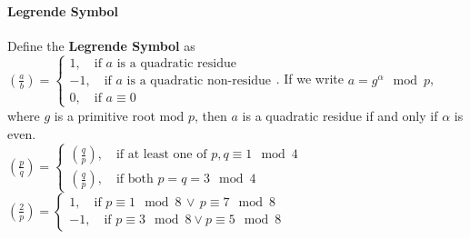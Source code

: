 \documentclass[10pt,letter]{article}
\theoremstyle{plain}
\theoremstyle{definition}
\begin{document}
\paragraph{Legrende Symbol}
Define the \textbf{Legrende Symbol} as $\left(\frac{a}{b}\right)=\begin{cases}1,\quad\text{if }a\text{ is a quadratic residue}\\-1,\quad\text{if }a\text{ is a quadratic non-residue}\\0,\quad\text{if }a\equiv0\end{cases}$. If we write $a=g^\alpha\mod{p}$, where $g$ is a primitive root mod $p$, then $a$ is a quadratic residue if and only if $\alpha$ is even. \\
$\left(\frac{p}{q}\right)=\begin{cases}\left(\frac{q}{p}\right),\quad\text{if at least one of }p,q\equiv1\mod4\\\left(\frac{q}{p}\right),\quad\text{if both }p=q=3\mod4\end{cases}$\\
$\left(\frac{2}{p}\right)=\begin{cases}1,\quad\text{if }p\equiv1\mod8\,\vee\,p\equiv7\mod8\\-1,\quad\text{if }p\equiv3\mod8\vee p\equiv5\mod8\end{cases}$
\end{document}
